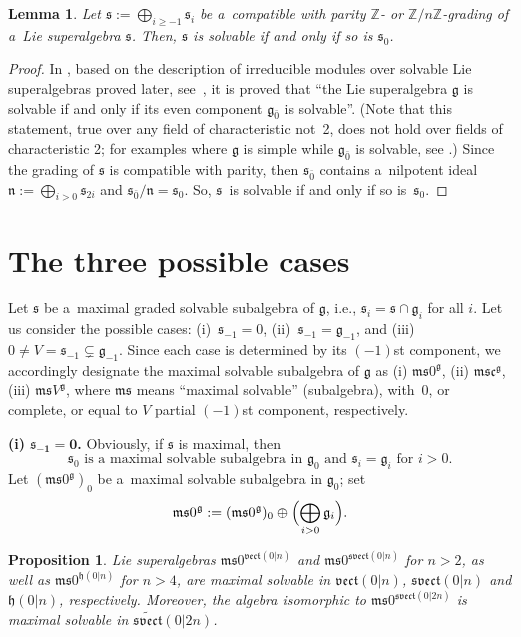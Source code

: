 \documentclass[pdftex]{sigma}
\newcommand {\Zee} {{\mathbb Z}}
\newcommand {\fc} {{\mathfrak{c}}}
\newcommand {\fg} {{\mathfrak{g}}} %
\newcommand {\fh} {{\mathfrak{h}}}
\newcommand {\fm} {{\mathfrak{m}}}
\newcommand {\fn} {{\mathfrak{n}}}
\newcommand {\fs} {{\mathfrak{s}}}
\newcommand {\fsvect} {{\mathfrak{svect}}}
\newcommand {\fvect} {{\mathfrak{vect}}} %
\newcommand {\ev} {{\bar0}}
\newcommand {\<} [2] {{\left.\vphantom{#2}\right.^{#1\!}\!{#2}}}
\numberwithin{equation}{section}
\newtheorem{Lemma}[Theorem]{Lemma}
\newtheorem{Proposition}[Theorem]{Proposition}
\begin{document}
\begin{Lemma}\label{L1} Let $\fs:=\bigoplus_{i\geq -1} \fs_i$ be a~compatible with parity $\Zee$- or $\Zee/n\Zee$-grading of a~Lie superalgebra $\fs$. Then, $\fs$ is solvable if and only if so is $\fs_0$.
\end{Lemma}

\begin{proof} In \cite[Proposition~1.3.3]{K}, based on the description of irreducible modules over solvable Lie superalgebras proved later, see~\cite{Sg}, it is proved that ``the Lie superalgebra $\fg$ is solvable if and only if its even component $\fg_\ev$ is solvable''. (Note that this statement, true over any field of characteristic not~2, does not hold over fields of characteristic 2; for examples where $\fg$ is simple while $\fg_\ev$ is solvable, see \cite{BGLLS, BGL}.) Since the grading of $\fs$ is compatible with parity, then $\fs_\ev$ contains a~nilpotent ideal $\fn:=\bigoplus_{i>0} \fs_{2i}$ and $\fs_\ev/\fn=\fs_0$. So, $\fs$~is solvable if and only if so is~$\fs_0$.
\end{proof}

\section{The three possible cases}\label{3cases}
Let $\fs$ be a~maximal graded solvable subalgebra of $\fg$, i.e., $\fs_i=\fs\cap\fg_i$ for all $i$. Let us consider the possible cases:
(i)~$\fs_{-1}=0$, (ii)~$\fs_{-1}=\fg_{-1}$, and (iii)~$0\neq V=\fs_{-1}\subsetneq\fg_{-1}$. Since each case is determined by its $(-1)$st component, we accordingly designate the maximal solvable subalgebra of $\fg$ as (i) $\fm\fs0^{\fg}$, (ii) $\fm\fs\fc^{\fg}$, (iii) $\fm\fs V^{\fg}$, where $\fm\fs$ means ``maximal solvable'' (subalgebra),
with~0, or complete, or equal to $V$ partial $(-1)$st component, respectively.

{\bf (i) $\boldsymbol{\fs_{-1}=0}$.} Obviously, if $\fs$ is maximal, then
\[
\text{$\fs_0$ is a~maximal solvable subalgebra in $\fg_0$ and $\fs_i=\fg_i$ for $i>0$}.
\]
Let $(\fm\fs0^{\fg})_0$ be a~maximal solvable
subalgebra in $\fg_0$; set
\begin{gather}\label{ms}
\fm\fs0^{\fg}:= (\fm\fs0^{\fg})_0\oplus\Bigl(\bigoplus_{i>0} \fg_i\Bigr).
\end{gather}

\begin{Proposition}\label{P1} Lie superalgebras $\fm\fs0^{\fvect(0|n)}$ and $\fm\fs0^{\fsvect(0|n)}$ for $n>2$, as well as $\fm\fs0^{\fh(0|n)}$ for $n>4$, are maximal solvable in $\fvect(0|n)$, $\fsvect(0|n)$ and $\fh(0|n)$, respectively. Moreover, the algebra isomorphic to $\fm\fs0^{\fsvect(0|2n)}$ is maximal solvable in $\widetilde{\fsvect}(0|2n)$.
\end{Proposition}
\end{document}
